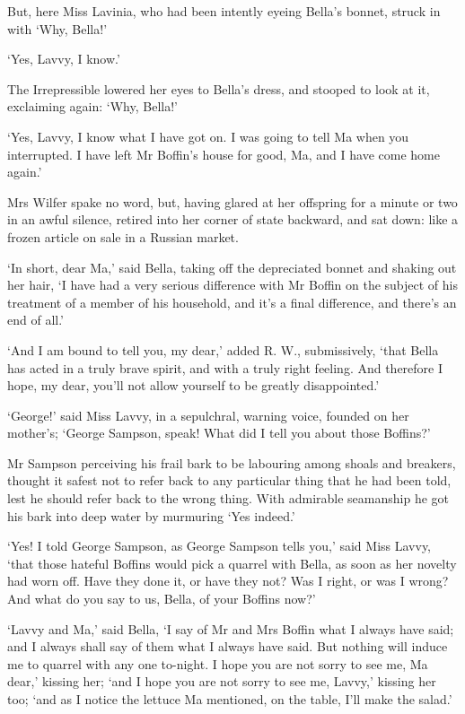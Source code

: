 But, here Miss Lavinia, who had been intently eyeing Bella’s bonnet,
struck in with ‘Why, Bella!’

‘Yes, Lavvy, I know.’

The Irrepressible lowered her eyes to Bella’s dress, and stooped to look
at it, exclaiming again: ‘Why, Bella!’

‘Yes, Lavvy, I know what I have got on. I was going to tell Ma when you
interrupted. I have left Mr Boffin’s house for good, Ma, and I have come
home again.’

Mrs Wilfer spake no word, but, having glared at her offspring for a
minute or two in an awful silence, retired into her corner of state
backward, and sat down: like a frozen article on sale in a Russian
market.

‘In short, dear Ma,’ said Bella, taking off the depreciated bonnet and
shaking out her hair, ‘I have had a very serious difference with Mr
Boffin on the subject of his treatment of a member of his household, and
it’s a final difference, and there’s an end of all.’

‘And I am bound to tell you, my dear,’ added R. W., submissively, ‘that
Bella has acted in a truly brave spirit, and with a truly right feeling.
And therefore I hope, my dear, you’ll not allow yourself to be greatly
disappointed.’

‘George!’ said Miss Lavvy, in a sepulchral, warning voice, founded on
her mother’s; ‘George Sampson, speak! What did I tell you about those
Boffins?’

Mr Sampson perceiving his frail bark to be labouring among shoals and
breakers, thought it safest not to refer back to any particular thing
that he had been told, lest he should refer back to the wrong thing.
With admirable seamanship he got his bark into deep water by murmuring
‘Yes indeed.’

‘Yes! I told George Sampson, as George Sampson tells you,’ said Miss
Lavvy, ‘that those hateful Boffins would pick a quarrel with Bella, as
soon as her novelty had worn off. Have they done it, or have they not?
Was I right, or was I wrong? And what do you say to us, Bella, of your
Boffins now?’

‘Lavvy and Ma,’ said Bella, ‘I say of Mr and Mrs Boffin what I always
have said; and I always shall say of them what I always have said. But
nothing will induce me to quarrel with any one to-night. I hope you
are not sorry to see me, Ma dear,’ kissing her; ‘and I hope you are not
sorry to see me, Lavvy,’ kissing her too; ‘and as I notice the lettuce
Ma mentioned, on the table, I’ll make the salad.’

